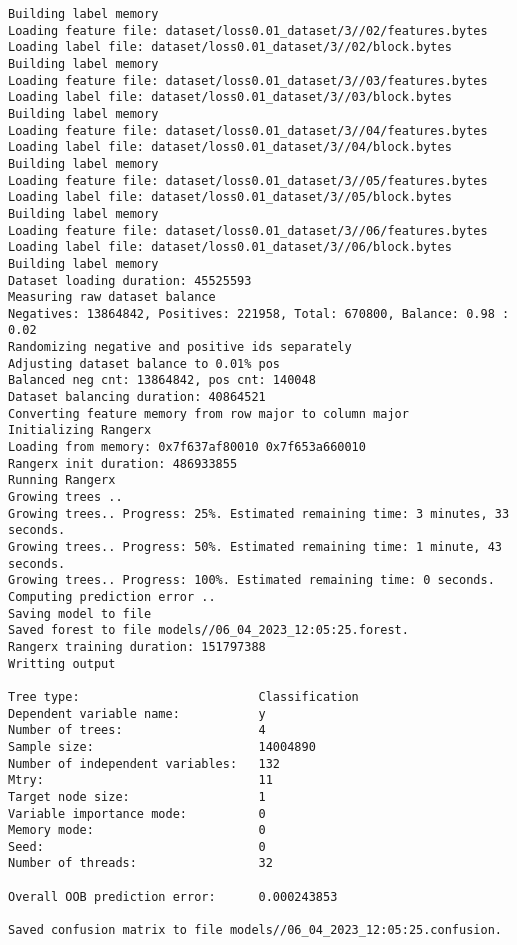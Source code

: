 \documentclass[12pt,oneside]{book}
\begin{document}
\begin{lstlisting}
Building label memory
Loading feature file: dataset/loss0.01_dataset/3//02/features.bytes
Loading label file: dataset/loss0.01_dataset/3//02/block.bytes
Building label memory
Loading feature file: dataset/loss0.01_dataset/3//03/features.bytes
Loading label file: dataset/loss0.01_dataset/3//03/block.bytes
Building label memory
Loading feature file: dataset/loss0.01_dataset/3//04/features.bytes
Loading label file: dataset/loss0.01_dataset/3//04/block.bytes
Building label memory
Loading feature file: dataset/loss0.01_dataset/3//05/features.bytes
Loading label file: dataset/loss0.01_dataset/3//05/block.bytes
Building label memory
Loading feature file: dataset/loss0.01_dataset/3//06/features.bytes
Loading label file: dataset/loss0.01_dataset/3//06/block.bytes
Building label memory
Dataset loading duration: 45525593
Measuring raw dataset balance
Negatives: 13864842, Positives: 221958, Total: 670800, Balance: 0.98 : 0.02
Randomizing negative and positive ids separately
Adjusting dataset balance to 0.01% pos
Balanced neg cnt: 13864842, pos cnt: 140048
Dataset balancing duration: 40864521
Converting feature memory from row major to column major
Initializing Rangerx
Loading from memory: 0x7f637af80010 0x7f653a660010
Rangerx init duration: 486933855
Running Rangerx
Growing trees ..
Growing trees.. Progress: 25%. Estimated remaining time: 3 minutes, 33 seconds.
Growing trees.. Progress: 50%. Estimated remaining time: 1 minute, 43 seconds.
Growing trees.. Progress: 100%. Estimated remaining time: 0 seconds.
Computing prediction error ..
Saving model to file
Saved forest to file models//06_04_2023_12:05:25.forest.
Rangerx training duration: 151797388
Writting output

Tree type:                         Classification
Dependent variable name:           y
Number of trees:                   4
Sample size:                       14004890
Number of independent variables:   132
Mtry:                              11
Target node size:                  1
Variable importance mode:          0
Memory mode:                       0
Seed:                              0
Number of threads:                 32

Overall OOB prediction error:      0.000243853

Saved confusion matrix to file models//06_04_2023_12:05:25.confusion.
\end{lstlisting}
\end{document}
